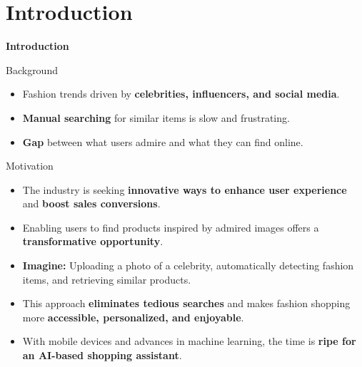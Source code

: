 \section{Introduction}
\begin{frame}{}
  \Huge
  \centering
  \textbf{Introduction}
  \normalsize
\end{frame}

\begin{frame}{Background}
\begin{itemize}
    \item Fashion trends driven by \textbf{celebrities, influencers, and social media}.
    \item \textbf{Manual searching} for similar items is slow and frustrating.
    \item \textbf{Gap} between what users admire and what they can find online.
\end{itemize}
\end{frame}



\begin{frame}{Motivation}
\begin{itemize}
    \item The industry is seeking \textbf{innovative ways to enhance user experience} and \textbf{boost sales conversions}.
    \item Enabling users to find products inspired by admired images offers a \textbf{transformative opportunity}.
    \item \textbf{Imagine:} Uploading a photo of a celebrity, automatically detecting fashion items, and retrieving similar products.
    \item This approach \textbf{eliminates tedious searches} and makes fashion shopping more \textbf{accessible, personalized, and enjoyable}.
    \item With mobile devices and advances in machine learning, the time is \textbf{ripe for an AI-based shopping assistant}.
\end{itemize}
\end{frame}


